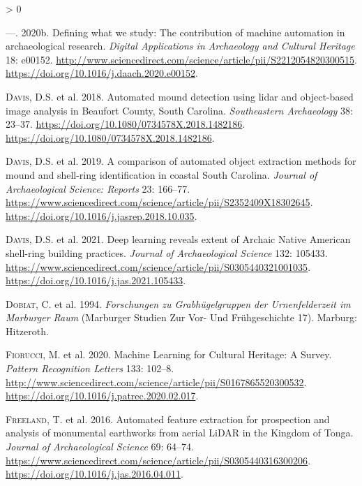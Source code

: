 \documentclass[
  12pt,
]{article}
\newlength{\cslhangindent}
\newenvironment{CSLReferences}[2] %
 {%
  \setlength{\parindent}{0pt}
  \ifodd #1 \everypar{\setlength{\hangindent}{\cslhangindent}}\ignorespaces\fi
  \ifnum #2 > 0
  \setlength{\parskip}{#2\baselineskip}
  \fi
 }%
 {}
\begin{document}
\begin{CSLReferences}{1}{0}
\leavevmode\hypertarget{ref-davisDefiningWhatWe2020}{}%
---. 2020b. Defining what we study: {The} contribution of machine automation in archaeological research. \emph{Digital Applications in Archaeology and Cultural Heritage} 18: e00152. \url{http://www.sciencedirect.com/science/article/pii/S2212054820300515}. \url{https://doi.org/10.1016/j.daach.2020.e00152}.

\leavevmode\hypertarget{ref-davisAutomatedMoundDetection2018a}{}%
\textsc{Davis}, D.S. et al. 2018. Automated mound detection using lidar and object-based image analysis in {Beaufort} {County}, {South} {Carolina}. \emph{Southeastern Archaeology} 38: 23--37. \url{https://doi.org/10.1080/0734578X.2018.1482186}. \url{https://doi.org/10.1080/0734578X.2018.1482186}.

\leavevmode\hypertarget{ref-davisComparisonAutomatedObject2019b}{}%
\textsc{Davis}, D.S. et al. 2019. A comparison of automated object extraction methods for mound and shell-ring identification in coastal {South} {Carolina}. \emph{Journal of Archaeological Science: Reports} 23: 166--77. \url{https://www.sciencedirect.com/science/article/pii/S2352409X18302645}. \url{https://doi.org/10.1016/j.jasrep.2018.10.035}.

\leavevmode\hypertarget{ref-davisDeepLearningReveals2021a}{}%
\textsc{Davis}, D.S. et al. 2021. Deep learning reveals extent of {Archaic} {Native} {American} shell-ring building practices. \emph{Journal of Archaeological Science} 132: 105433. \url{https://www.sciencedirect.com/science/article/pii/S0305440321001035}. \url{https://doi.org/10.1016/j.jas.2021.105433}.

\leavevmode\hypertarget{ref-dobiatForschungenGrabhugelgruppenUrnenfelderzeit1994a}{}%
\textsc{Dobiat}, C. et al. 1994. \emph{Forschungen zu {Grabhügelgruppen} der {Urnenfelderzeit} im {Marburger} {Raum}} (Marburger {Studien} Zur {Vor}- Und {Frühgeschichte} 17). Marburg: Hitzeroth.

\leavevmode\hypertarget{ref-fiorucciMachineLearningCultural2020}{}%
\textsc{Fiorucci}, M. et al. 2020. Machine {Learning} for {Cultural} {Heritage}: {A} {Survey}. \emph{Pattern Recognition Letters} 133: 102--8. \url{http://www.sciencedirect.com/science/article/pii/S0167865520300532}. \url{https://doi.org/10.1016/j.patrec.2020.02.017}.

\leavevmode\hypertarget{ref-freelandAutomatedFeatureExtraction2016b}{}%
\textsc{Freeland}, T. et al. 2016. Automated feature extraction for prospection and analysis of monumental earthworks from aerial {LiDAR} in the {Kingdom} of {Tonga}. \emph{Journal of Archaeological Science} 69: 64--74. \url{https://www.sciencedirect.com/science/article/pii/S0305440316300206}. \url{https://doi.org/10.1016/j.jas.2016.04.011}.


\end{CSLReferences}
\end{document}

